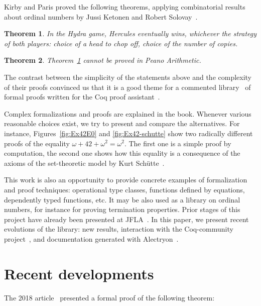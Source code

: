 \documentclass{easychair}
\newtheorem{theorem}{Theorem}
\newcommand{\coq}{Coq\xspace}
\newcommand{\community}{Coq-community\xspace}
\newcommand{\alectr}{Alectryon\xspace}
\begin{document}

Kirby and Paris proved the following theorems, applying
combinatorial results about ordinal numbers by Jussi Ketonen and Robert Solovay~\cite{KS81}.

\begin{theorem}
  In the Hydra game, Hercules eventually wins, whichever the strategy of both players:
  choice of a head to chop off, choice of the number of copies. 
 \label{kp:thm1}
\end{theorem}

\begin{theorem}
  Theorem~\ref{kp:thm1} cannot be proved in Peano Arithmetic. \label{kp:thm2}
\end{theorem}

The contrast between the simplicity of the statements above and the complexity of their proofs convinced us that it is a good theme for a commented library~\cite{HydraBattles} of formal proofs written for the \coq proof assistant~\cite{Coq}. 

Complex formalizations and proofs are explained in the book.
Whenever various reasonable choices exist, we try to present and compare the alternatives.
  For instance, Figures~\ref{fig:Ex42E0} and \ref{fig:Ex42-schutte} show two radically different proofs of the equality
  $\omega+42+\omega^2=\omega^2$. The first one is a simple proof by computation, the second one shows how this equality
  is a consequence of the axioms of the set-theoretic model  by Kurt Schütte~\cite{schutte}. 

This work is also an opportunity to 
 provide concrete examples of formalization and proof techniques: operational type classes, functions defined by  equations, dependently typed functions, etc. It may be also used as a library on ordinal numbers, for instance for proving termination properties.
%
 Prior stages of this project have already been presented at
 JFLA~\cite{PCiota, JFLA2018paper}.
In this paper, we present recent evolutions of the library: new results, interaction with the \community project~\cite{CoqCommunity}, and documentation generated with \alectr~\cite{alectryonpaper, alectryongithub}.

\section{Recent developments}
The 2018 article~\cite{JFLA2018paper} presented a formal proof of the following theorem:
\end{document}
